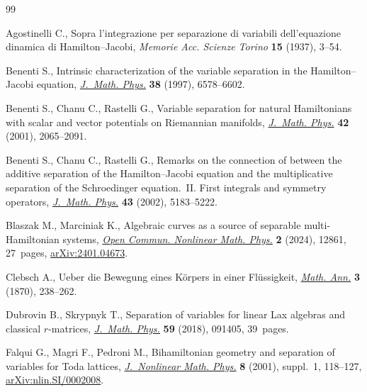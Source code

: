 \documentclass[10pt,a4paper]{amsart}
\numberwithin{equation}{section}
\begin{document}


\begin{thebibliography}{99}
\footnotesize\itemsep=0pt

Agostinelli C., Sopra l'integrazione per separazione di variabili
 dell'equazione dinamica di {H}amilton--{J}acobi, \textit{Memorie Acc. Scienze
 Torino} \textbf{15} (1937), 3--54.

Benenti S., Intrinsic characterization of the variable separation in the
 {H}amilton--{J}acobi equation,
 \href{https://doi.org/10.1063/1.532226}{\textit{J.~Math. Phys.}} \textbf{38}
 (1997), 6578--6602.

Benenti S., Chanu C., Rastelli G., Variable separation for natural
 {H}amiltonians with scalar and vector potentials on {R}iemannian manifolds,
 \href{https://doi.org/10.1063/1.1340868}{\textit{J.~Math. Phys.}} \textbf{42}
 (2001), 2065--2091.

Benenti S., Chanu C., Rastelli G., Remarks on the connection of between the
 additive separation of the {H}amilton--{J}acobi equation and the
 multiplicative separation of the Schroedinger equation.~{II}. First integrals
 and symmetry operators,
 \href{https://doi.org/10.1063/1.1506181}{\textit{J.~Math. Phys.}} \textbf{43}
 (2002), 5183--5222.

Blaszak M., Marciniak K., Algebraic curves as a source of separable
 multi-{H}amiltonian systems,
 \href{https://doi.org/10.46298/ocnmp.12861}{\textit{Open Commun. Nonlinear
 Math. Phys.}} \textbf{2} (2024), 12861, 27~pages,
 \href{http://arxiv.org/abs/2401.04673}{arXiv:2401.04673}.

Clebsch A., Ueber die {B}ewegung eines {K}\"orpers in einer {F}l\"ussigkeit,
 \href{https://doi.org/10.1007/BF01443985}{\textit{Math. Ann.}} \textbf{3}
 (1870), 238--262.

Dubrovin B., Skrypnyk T., Separation of variables for linear {L}ax algebras and
 classical {$r$}-matrices,
 \href{https://doi.org/10.1063/1.5031769}{\textit{J.~Math. Phys.}} \textbf{59}
 (2018), 091405, 39~pages.

Falqui G., Magri F., Pedroni M., Bihamiltonian geometry and separation of
 variables for {T}oda lattices,
 \href{https://doi.org/10.2991/jnmp.2001.8.s.21}{\textit{J.~Nonlinear Math.
 Phys.}} \textbf{8} (2001), suppl.~1, 118--127,
 \href{http://arxiv.org/abs/nlin.SI/0002008}{arXiv:nlin.SI/0002008}.


\end{thebibliography}
\end{document}
